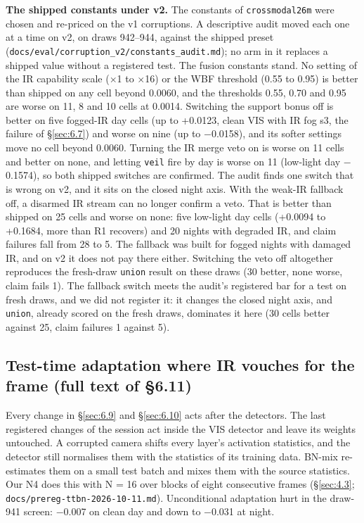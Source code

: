 \documentclass[10pt]{article}
\begin{document}
\textbf{The shipped constants under v2.} The constants of \texttt{crossmodal26m} were chosen and re-priced on the v1 corruptions. A descriptive audit moved each one at a time on v2, on draws 942--944, against the shipped preset (\texttt{docs/\allowbreak{}eval/\allowbreak{}corruption\_\allowbreak{}v2/\allowbreak{}constants\_\allowbreak{}audit.md}); no arm in it replaces a shipped value without a registered test. The fusion constants stand. No setting of the IR capability scale ($\times$1 to $\times$16) or the WBF threshold (0.55 to 0.95) is better than shipped on any cell beyond 0.0060, and the thresholds 0.55, 0.70 and 0.95 are worse on 11, 8 and 10 cells at 0.0014. Switching the support bonus off is better on five fogged-IR day cells (up to +0.0123, clean VIS with IR fog s3, the failure of \S\ref{sec:6.7}) and worse on nine (up to $-$0.0158), and its softer settings move no cell beyond 0.0060. Turning the IR merge veto on is worse on 11 cells and better on none, and letting \texttt{veil} fire by day is worse on 11 (low-light day $-$0.1574), so both shipped switches are confirmed. The audit finds one switch that is wrong on v2, and it sits on the closed night axis. With the weak-IR fallback off, a disarmed IR stream can no longer confirm a veto. That is better than shipped on 25 cells and worse on none: five low-light day cells (+0.0094 to +0.1684, more than R1 recovers) and 20 nights with degraded IR, and claim failures fall from 28 to 5. The fallback was built for fogged nights with damaged IR, and on v2 it does not pay there either. Switching the veto off altogether reproduces the fresh-draw \texttt{union} result on these draws (30 better, none worse, claim fails 1). The fallback switch meets the audit's registered bar for a test on fresh draws, and we did not register it: it changes the closed night axis, and \texttt{union}, already scored on the fresh draws, dominates it here (30 cells better against 25, claim failures 1 against 5).

\subsection{Test-time adaptation where IR vouches for the frame (full text of \S6.11)}\label{app:J.5}
Every change in \S\ref{sec:6.9} and \S\ref{sec:6.10} acts after the detectors. The last registered changes of the session act inside the VIS detector and leave its weights untouched. A corrupted camera shifts every layer's activation statistics, and the detector still normalises them with the statistics of its training data. BN-mix \citep{schneider2020improving} re-estimates them on a small test batch and mixes them with the source statistics. Our N4 does this with N = 16 over blocks of eight consecutive frames (\S\ref{sec:4.3}; \texttt{docs/\allowbreak{}prereg-ttbn-2026-10-11.md}). Unconditional adaptation hurt in the draw-941 screen: $-$0.007 on clean day and down to $-$0.031 at night.
\end{document}

